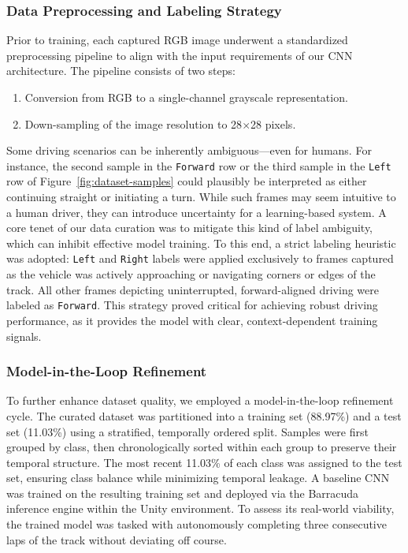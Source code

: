 \subsubsection{Data Preprocessing and Labeling Strategy}
Prior to training, each captured RGB image underwent a standardized preprocessing pipeline to align with the input requirements of our CNN architecture. The pipeline consists of two steps:
\begin{enumerate}
    \item Conversion from RGB to a single-channel grayscale representation.
    \item Down-sampling of the image resolution to 28$\times$28 pixels.
\end{enumerate}

Some driving scenarios can be inherently ambiguous—even for humans. For instance, the second sample in the \texttt{Forward} row or the third sample in the \texttt{Left} row of Figure~\ref{fig:dataset-samples} could plausibly be interpreted as either continuing straight or initiating a turn. While such frames may seem intuitive to a human driver, they can introduce uncertainty for a learning-based system. A core tenet of our data curation was to mitigate this kind of label ambiguity, which can inhibit effective model training. To this end, a strict labeling heuristic was adopted: \texttt{Left} and \texttt{Right} labels were applied exclusively to frames captured as the vehicle was actively approaching or navigating corners or edges of the track. All other frames depicting uninterrupted, forward-aligned driving were labeled as \texttt{Forward}. This strategy proved critical for achieving robust driving performance, as it provides the model with clear, context-dependent training signals.

\subsubsection{Model-in-the-Loop Refinement}
To further enhance dataset quality, we employed a model-in-the-loop refinement cycle. The curated dataset was partitioned into a training set (88.97\%) and a test set (11.03\%) using a stratified, temporally ordered split. Samples were first grouped by class, then chronologically sorted within each group to preserve their temporal structure. The most recent 11.03\% of each class was assigned to the test set, ensuring class balance while minimizing temporal leakage. A baseline CNN was trained on the resulting training set and deployed via the Barracuda inference engine within the Unity environment. To assess its real-world viability, the trained model was tasked with autonomously completing three consecutive laps of the track without deviating off course.

